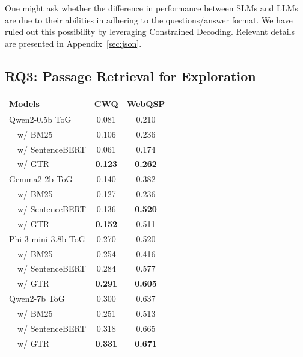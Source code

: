 \documentclass[11pt]{article}
\begin{document}
One might ask whether the difference in performance between SLMs and LLMs are due to their abilities in adhering to the questions/answer format. We have ruled out this possibility by leveraging Constrained Decoding. Relevant details are presented in Appendix~\ref{sec:json}.
\subsection{RQ3: Passage Retrieval for Exploration} \label{sec:slm_retrieval}
\begin{table}[ht]
  \centering
  \begin{tabular}{lcc}
    \toprule
    \bf Models & \bf CWQ & \bf WebQSP \\
    \hline
    Qwen2-0.5b ToG  & 0.081 & 0.210 \\
    $\quad$w/ BM25 & 0.106 & 0.236 \\
    $\quad$w/ SentenceBERT & 0.061 & 0.174 \\
    $\quad$w/ GTR & \textbf{0.123} & \textbf{0.262} \\ \hline
    Gemma2-2b ToG & 0.140 & 0.382 \\
    $\quad$w/ BM25 & 0.127 & 0.236\\
    $\quad$w/ SentenceBERT & 0.136 & \textbf{0.520} \\
    $\quad$w/ GTR & \textbf{0.152} & 0.511 \\ \hline
    Phi-3-mini-3.8b ToG & 0.270 & 0.520 \\
    $\quad$w/ BM25 & 0.254 & 0.416 \\
    $\quad$w/ SentenceBERT & 0.284 & 0.577 \\
    $\quad$w/ GTR & \textbf{0.291} & \textbf{0.605}\\ \hline
    Qwen2-7b ToG   & 0.300 & 0.637 \\
    $\quad$w/ BM25 & 0.251 & 0.513 \\
    $\quad$w/ SentenceBERT & 0.318 & 0.665 \\
    $\quad$w/ GTR & \textbf{0.331} & \textbf{0.671} \\ \hline

\end{tabular}
\end{table}
\end{document}
